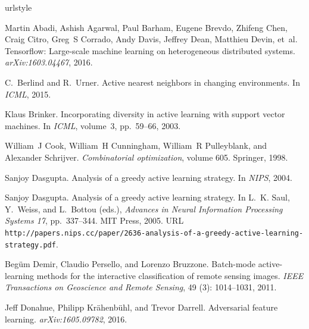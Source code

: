 \documentclass{article} %
\begin{document}
\begin{thebibliography}{51}
\providecommand{\natexlab}[1]{#1}
\providecommand{\url}[1]{\texttt{#1}}
\expandafter\ifx\csname urlstyle\endcsname\relax
  \providecommand{\doi}[1]{doi: #1}\else
  \providecommand{\doi}{doi: \begingroup \urlstyle{rm}\Url}\fi

Martin Abadi, Ashish Agarwal, Paul Barham, Eugene Brevdo, Zhifeng Chen, Craig
  Citro, Greg~S Corrado, Andy Davis, Jeffrey Dean, Matthieu Devin, et~al.
\newblock Tensorflow: Large-scale machine learning on heterogeneous distributed
  systems.
\newblock \emph{arXiv:1603.04467}, 2016.

C.~Berlind and R.~Urner.
\newblock Active nearest neighbors in changing environments.
\newblock In \emph{ICML}, 2015.

Klaus Brinker.
\newblock Incorporating diversity in active learning with support vector
  machines.
\newblock In \emph{ICML}, volume~3, pp.\  59--66, 2003.

William~J Cook, William~H Cunningham, William~R Pulleyblank, and Alexander
  Schrijver.
\newblock \emph{Combinatorial optimization}, volume 605.
\newblock Springer, 1998.

Sanjoy Dasgupta.
\newblock Analysis of a greedy active learning strategy.
\newblock In \emph{NIPS}, 2004.

Sanjoy Dasgupta.
\newblock Analysis of a greedy active learning strategy.
\newblock In L.~K. Saul, Y.~Weiss, and L.~Bottou (eds.), \emph{Advances in
  Neural Information Processing Systems 17}, pp.\  337--344. MIT Press, 2005.
\newblock URL
  \url{http://papers.nips.cc/paper/2636-analysis-of-a-greedy-active-learning-strategy.pdf}.

Beg{\"u}m Demir, Claudio Persello, and Lorenzo Bruzzone.
\newblock Batch-mode active-learning methods for the interactive classification
  of remote sensing images.
\newblock \emph{IEEE Transactions on Geoscience and Remote Sensing},
  49 (3): 1014--1031, 2011.

Jeff Donahue, Philipp Kr{\"a}henb{\"u}hl, and Trevor Darrell.
\newblock Adversarial feature learning.
\newblock \emph{arXiv:1605.09782}, 2016.


\end{thebibliography}
\end{document}
